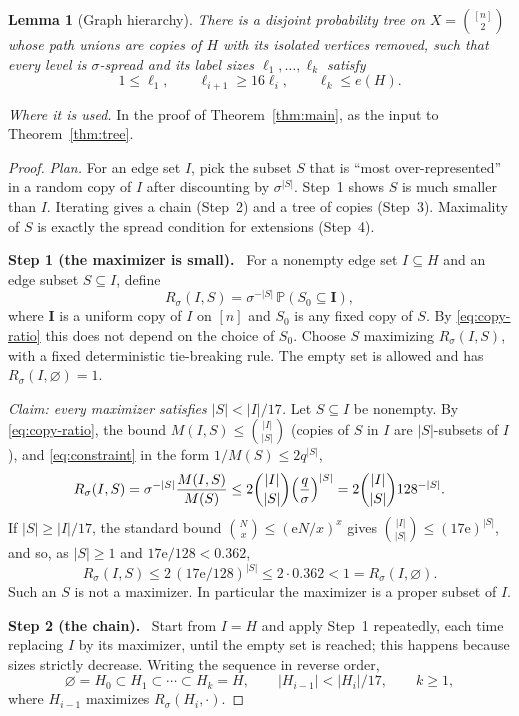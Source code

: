\documentclass[11pt]{article}
\newtheorem{lemma}[theorem]{Lemma}
\numberwithin{equation}{section}
\theoremstyle{remark}
\newcommand{\PP}{\mathbb P}
\newcommand{\ee}{\mathrm e}
\newcommand{\step}[1]{\par\medskip\noindent\textbf{#1}\ }
\begin{document}
\begin{lemma}[Graph hierarchy]\label{lem:hierarchy}
There is a disjoint probability tree on $X=\binom{[n]}2$ whose path
unions are copies of $H$ with its isolated vertices removed, such that
every level is $\sigma$-spread and its label sizes
$\ell_1,\ldots,\ell_k$ satisfy
\[
 1\le\ell_1,\qquad \ell_{i+1}\ge16\ell_i,
 \qquad \ell_k\le e(H).
\]
\end{lemma}

\emph{Where it is used.} In the proof of Theorem~\ref{thm:main}, as the
input to Theorem~\ref{thm:tree}.

\begin{proof}
\emph{Plan.} For an edge set $I$, pick the subset $S$ that is ``most
over-represented'' in a random copy of $I$ after discounting by
$\sigma^{|S|}$. Step~1 shows $S$ is much smaller than $I$. Iterating
gives a chain (Step~2) and a tree of copies (Step~3). Maximality of $S$
is exactly the spread condition for extensions (Step~4).

\step{Step 1 (the maximizer is small).} For a nonempty edge set
$I\subseteq H$ and an edge subset $S\subseteq I$, define
\begin{equation}\label{eq:maximizer}
 R_\sigma(I,S)=\sigma^{-|S|}\,\PP(S_0\subseteq\boldsymbol I),
\end{equation}
where $\boldsymbol I$ is a uniform copy of $I$ on $[n]$ and $S_0$ is any
fixed copy of $S$. By \eqref{eq:copy-ratio} this does not depend on the
choice of $S_0$. Choose $S$ maximizing $R_\sigma(I,S)$, with a fixed
deterministic tie-breaking rule. The empty set is allowed and has
$R_\sigma(I,\varnothing)=1$.

\emph{Claim: every maximizer satisfies $|S|<|I|/17$.} Let
$S\subseteq I$ be nonempty. By \eqref{eq:copy-ratio}, the bound
$M(I,S)\le\binom{|I|}{|S|}$ (copies of $S$ in $I$ are $|S|$-subsets of
$I$), and \eqref{eq:constraint} in the form $1/M(S)\le2q^{|S|}$,
\[
 R_\sigma(I,S)=\sigma^{-|S|}\frac{M(I,S)}{M(S)}
 \le2\binom{|I|}{|S|}\Bigl(\frac q\sigma\Bigr)^{|S|}
 =2\binom{|I|}{|S|}128^{-|S|}.
\]
If $|S|\ge|I|/17$, the standard bound
$\binom Nx\le(\ee N/x)^x$ gives
$\binom{|I|}{|S|}\le(17\ee)^{|S|}$, and so, as $|S|\ge1$ and
$17\ee/128<0.362$,
\[
 R_\sigma(I,S)\le2\,(17\ee/128)^{|S|}\le2\cdot0.362<1
 =R_\sigma(I,\varnothing).
\]
Such an $S$ is not a maximizer. In particular the maximizer is a proper
subset of $I$.

\step{Step 2 (the chain).} Start from $I=H$ and apply Step~1
repeatedly, each time replacing $I$ by its maximizer, until the empty
set is reached; this happens because sizes strictly decrease. Writing
the sequence in reverse order,
\[
 \varnothing=H_0\subset H_1\subset\cdots\subset H_k=H,
 \qquad |H_{i-1}|<|H_i|/17,\qquad k\ge1,
\]
where $H_{i-1}$ maximizes $R_\sigma(H_i,\cdot)$.


\end{proof}
\end{document}
